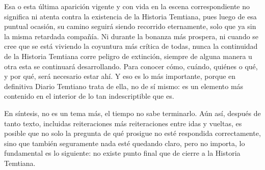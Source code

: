 \documentclass[
]{book}
\begin{document}
Esa o esta última aparición vigente y con vida en la escena correspondiente no significa ni atenta contra la existencia de la Historia Temtiana, pues luego de esa puntual ocasión, su camino seguirá siendo recorrido eternamente, solo que ya sin la misma retardada compañía. Ni durante la bonanza más prospera, ni cuando se cree que se está viviendo la coyuntura más crítica de todas, nunca la continuidad de la Historia Temtiana corre peligro de extinción, siempre de alguna manera u otra esta se continuará desarrollando. Para conocer cómo, cuándo, quiénes o qué, y por qué, será necesario estar ahí. Y eso es lo más importante, porque en definitiva Diario Temtiano trata de ella, no de sí mismo: es un elemento más contenido en el interior de lo tan indescriptible que es.

En síntesis, no es un tema más, el tiempo no sabe terminarlo. Aún así, después de tanto texto, incluidas reiteraciones más reiteraciones entre idas y vueltas, es posible que no solo la pregunta de qué prosigue no esté respondida correctamente, sino que también seguramente nada esté quedando claro, pero no importa, lo fundamental es lo siguiente: no existe punto final que de cierre a la Historia Temtiana.
\end{document}
